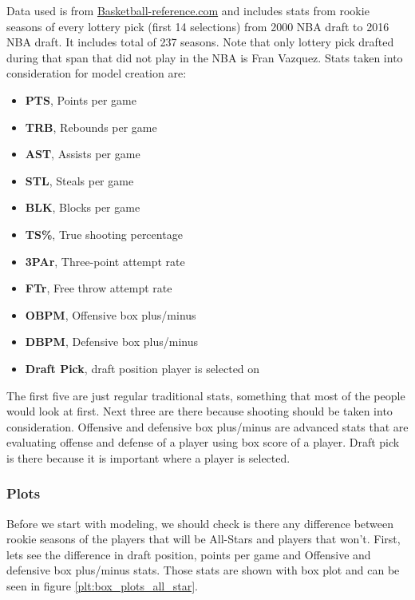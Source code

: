 \documentclass[a4paper]{article}
\begin{document}
Data used is from \href{https://www.basketball-reference.com/}{Basketball-reference.com} and includes stats from rookie seasons of every lottery pick (first 14 selections) from 2000 NBA draft to 2016 NBA draft. It includes total of 237 seasons. Note that only lottery pick drafted during that span that did not play in the NBA is Fran Vazquez. Stats taken into consideration for model creation are:

\begin{itemize}
	\item \textbf{PTS}, Points per game
	\item \textbf{TRB}, Rebounds per game
	\item \textbf{AST}, Assists per game
	\item \textbf{STL}, Steals per game
	\item \textbf{BLK}, Blocks per game
	\item \textbf{TS\%}, True shooting percentage
	\item \textbf{3PAr}, Three-point attempt rate
	\item \textbf{FTr}, Free throw attempt rate
	\item \textbf{OBPM}, Offensive box plus/minus
	\item \textbf{DBPM}, Defensive box plus/minus
	\item \textbf{Draft Pick}, draft position player is selected on
\end{itemize}

The first five are just regular traditional stats, something that most of the people would look at first. Next three are there because shooting should be taken into consideration. Offensive and defensive box plus/minus are advanced stats that are evaluating offense and defense of a player using box score of a player. Draft pick is there because it is important where a player is selected.

\subsubsection{Plots}
\label{subsubsec:plots_all_stars}

Before we start with modeling, we should check is there any difference between rookie seasons of the players that will be All-Stars and players that won't. First, lets see the difference in draft position, points per game and Offensive and defensive box plus/minus stats. Those stats are shown with box plot \cite{boxplots} and can be seen in figure \ref{plt:box_plots_all_star}.
\end{document}

